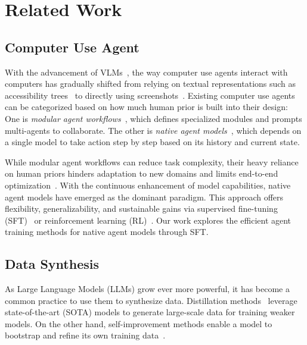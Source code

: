 \documentclass{article} %
\renewcommand{\cite}{\citep}
\begin{document}
\section{Related Work}
\label{gen_inst}


\subsection{Computer Use Agent}


With the advancement of VLMs~\cite{bai2025qwen25vltechnicalreport,deitke2024molmo}, the way computer use agents interact with computers has gradually shifted from relying on textual representations such as accessibility trees~\cite{2024agents,wu2024oscopilot} to directly using screenshots~\cite{uitars2025, xu2025aguvisunifiedpurevision, he2024pcagentsleepai}. Existing computer use agents can be categorized based on how much human prior is built into their design: One is \textit{modular agent workflows}~\cite{2024agents,wu2024oscopilot}, which defines specialized modules and prompts multi-agents to collaborate. The other is \textit{native agent models}~\cite{2024claudecomputeruse,uitars2025,2025openaicua}, which depends on a single model to take action step by step based on its history and current state.

While modular agent workflows can reduce task complexity, their heavy reliance on human priors hinders adaptation to new domains and limits end-to-end optimization~\cite{SaltzerReedClark1984end2end,pan2024swegym}. With the continuous enhancement of model capabilities, native agent models have emerged as the dominant paradigm. This approach offers flexibility, generalizability, and sustainable gains via supervised fine-tuning (SFT)~\cite{xu2025aguvisunifiedpurevision} or reinforcement learning (RL)~\cite{2025openaicua}. Our work explores the efficient agent training methods for native agent models through SFT.

\subsection{Data Synthesis}
As Large Language Models (LLMs) grow ever more powerful, it has become a common practice to use them to synthesize data. Distillation methods~\cite{taori2023alpaca, gunasekar2023textbooksneed, xu2023wizardlmempoweringlargelanguage} leverage state-of-the-art (SOTA) models to generate large-scale data for training weaker models. On the other hand, self-improvement methods enable a model to bootstrap and refine its own training data~\cite{wang2023selfinstructaligninglanguagemodels2}.
\end{document}
